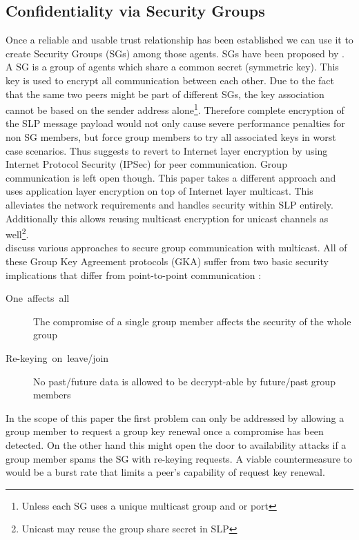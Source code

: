 \subsection{Confidentiality via Security Groups\label{sub:Confidentiality-via-Security}}
Once a reliable and usable trust relationship has been established we can use it to create Security Groups (SGs) among those agents. SGs have been proposed by \citet{Hollick2001}. A SG is a group of agents which share a common secret (symmetric key). This key is used to encrypt all communication between each other. Due to the fact that the same two peers might be part of different SGs, the key association cannot be based on the sender address alone\footnote{Unless each SG uses a unique multicast group and or port}. Therefore complete encryption of the SLP message payload would not only cause severe performance penalties for non SG members, but force group members to try all associated keys in worst case scenarios. Thus \citet{Hollick2001} suggests to revert to Internet layer encryption by using Internet Protocol Security (IPSec) \citep{Kent2005} for peer communication. Group communication is left open though. This paper takes a different approach and uses application layer encryption on top of Internet layer multicast. This alleviates the network requirements and handles security within SLP entirely. Additionally this allows reusing multicast encryption for unicast channels as well\footnote{Unicast may reuse the group share secret in SLP}.\\
\citet{Huang2007} discuss various approaches to secure group communication with multicast. All of these Group Key Agreement protocols (GKA) suffer from two basic security implications that differ from point-to-point communication \citep{Prakash2008}:
\begin{description}
\item [One~affects~all] The compromise of a single group member affects the security of the whole group
\item [Re-keying~on~leave/join] No past/future data is allowed to be decrypt-able by future/past group members
\end{description}
In the scope of this paper the first problem can only be addressed by allowing a group member to request a group key renewal once a compromise has been detected. On the other hand this might open the door to availability attacks if a group member spams the SG with re-keying requests. A viable countermeasure to would be a burst rate that limits a peer's capability of request key renewal.\\
